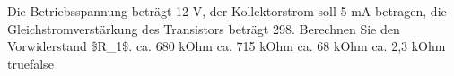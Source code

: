     {Die Betriebsspannung beträgt 12 V, der Kollektorstrom soll 5 mA betragen, die Gleichstromverstärkung des Transistors beträgt 298. Berechnen Sie den Vorwiderstand \$R\_1\$.}
    {ca. 680 kOhm}
    {ca. 715 kOhm}
    {ca. 68 kOhm}
    {ca. 2,3 kOhm}
    {true}{false}